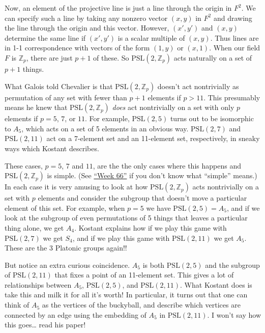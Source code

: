 \documentclass{article}
\begin{document}
Now, an element of the projective line is just a line through the origin
in \(F^2\). We can specify such a line by taking any nonzero vector
\((x,y)\) in \(F^2\) and drawing the line through the origin and this
vector. However, \((x',y')\) and \((x,y)\) determine the same line if
\((x',y')\) is a scalar multiple of \((x,y)\). Thus lines are in 1-1
correspondence with vectors of the form \((1,y)\) or \((x,1)\). When our
field \(F\) is \(\mathbb{Z}_p\), there are just \(p+1\) of these. So
\(\mathrm{PSL}(2,\mathbb{Z}_p)\) acts naturally on a set of \(p+1\)
things.

What Galois told Chevalier is that \(\mathrm{PSL}(2,\mathbb{Z}_p)\)
doesn't act nontrivially as permutation of any set with fewer than
\(p+1\) elements if \(p > 11\). This presumably means he knew that
\(\mathrm{PSL}(2,\mathbb{Z}_p)\) \emph{does} act nontrivially on a set
with only \(p\) elements if \(p = 5\), \(7\), or \(11\). For example,
\(\mathrm{PSL}(2,5)\) turns out to be isomorphic to \(A_5\), which acts
on a set of 5 elements in an obvious way. \(\mathrm{PSL}(2,7)\) and
\(\mathrm{PSL}(2,11)\) act on a 7-element set and an 11-element set,
respectively, in sneaky ways which Kostant describes.

These cases, \(p = 5\), \(7\) and \(11\), are the the only cases where
this happens and \(\mathrm{PSL}(2,\mathbb{Z}_p)\) is simple. (See
\protect\hyperlink{week66}{``Week 66''} if you don't know what
``simple'' means.) In each case it is very amusing to look at how
\(\mathrm{PSL}(2,\mathbb{Z}_p)\) acts nontrivially on a set with \(p\)
elements and consider the subgroup that doesn't move a particular
element of this set. For example, when \(p = 5\) we have
\(\mathrm{PSL}(2,5) = A_5\), and if we look at the subgroup of even
permutations of 5 things that leaves a particular thing alone, we get
\(A_4\). Kostant explains how if we play this game with
\(\mathrm{PSL}(2,7)\) we get \(S_4\), and if we play this game with
\(\mathrm{PSL}(2,11)\) we get \(A_5\). These are the 3 Platonic groups
again!!

But notice an extra curious coincidence. \(A_5\) is both
\(\mathrm{PSL}(2,5)\) and the subgroup of \(\mathrm{PSL}(2,11)\) that
fixes a point of an 11-element set. This gives a lot of relationships
between \(A_5\), \(\mathrm{PSL}(2,5)\), and \(\mathrm{PSL}(2,11)\). What
Kostant does is take this and milk it for all it's worth! In particular,
it turns out that one can think of \(A_5\) as the vertices of the
buckyball, and describe which vertices are connected by an edge using
the embedding of \(A_5\) in \(\mathrm{PSL}(2,11)\). I won't say how this
goes\ldots{} read his paper!
\end{document}
